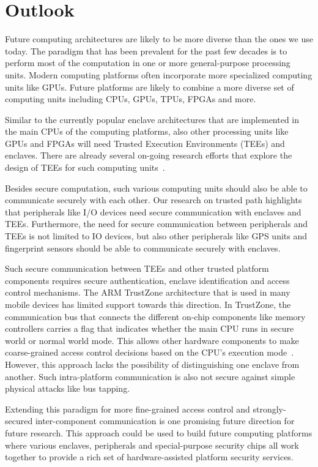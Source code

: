 
\section*{Outlook}


Future computing architectures are likely to be more diverse than the ones we use today. The paradigm that has been prevalent for the past few decades is to perform most of the computation in one or more general-purpose processing units. Modern computing platforms often incorporate more specialized computing units like GPUs. Future platforms are likely to combine a more diverse set of computing units including CPUs, GPUs, TPUs, FPGAs and more. %

Similar to the currently popular enclave architectures that are implemented in the main CPUs of the computing platforms, also other processing units like GPUs and FPGAs will need Trusted Execution Environments (TEEs) and enclaves. There are already several on-going research efforts that explore the design of TEEs for such computing units~\cite{volos2018graviton}.

Besides secure computation, such various computing units should also be able to communicate securely with each other. Our research on trusted path highlights that peripherals like I/O devices need secure communication with enclaves and TEEs. Furthermore, the need for secure communication between peripherals and TEEs is not limited to IO devices, but also other peripherals like GPS units and fingerprint sensors should be able to communicate securely with enclaves. 

Such secure communication between TEEs and other trusted platform components requires secure authentication, enclave identification and access control mechanisms. The ARM TrustZone architecture that is used in many mobile devices has limited support towards this direction. In TrustZone, the communication bus that connects the different on-chip components like memory controllers carries a flag that indicates whether the main CPU runs in secure world or normal world mode. This allows other hardware components to make coarse-grained access control decisions based on the CPU's execution mode~\cite{ekberg2014untapped}. However, this approach lacks the possibility of distinguishing one enclave from another. Such intra-platform communication is also not secure against simple physical attacks like bus tapping. 

Extending this paradigm for more fine-grained access control and strongly-secured inter-component communication is one promising future direction for future research. This approach could be used to build future computing platforms where various enclaves, peripherals and special-purpose security chips all work together to provide a rich set of hardware-assisted platform security services.
